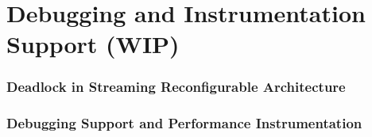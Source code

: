 \section{Debugging and Instrumentation Support (WIP)}
\subsubsection{Deadlock in Streaming Reconfigurable Architecture}

\subsubsection{Debugging Support and Performance Instrumentation}
